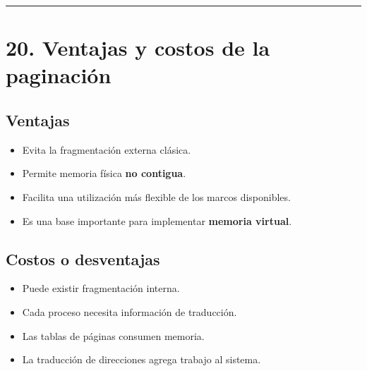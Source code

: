 \documentclass[
  spanish,
  letterpaper,
]{scrbook}
\providecommand{\tightlist}{%
  \setlength{\itemsep}{0pt}\setlength{\parskip}{0pt}}
\begin{document}
\begin{center}\rule{0.5\linewidth}{0.5pt}\end{center}


\chapter{20. Ventajas y costos de la
paginación}\label{ventajas-y-costos-de-la-paginaciuxf3n}

\section{Ventajas}\label{ventajas-10}

\begin{itemize}
\tightlist
\item
  Evita la fragmentación externa clásica.
\item
  Permite memoria física \textbf{no contigua}.
\item
  Facilita una utilización más flexible de los marcos disponibles.
\item
  Es una base importante para implementar \textbf{memoria virtual}.
\end{itemize}

\section{Costos o desventajas}\label{costos-o-desventajas}

\begin{itemize}
\tightlist
\item
  Puede existir fragmentación interna.
\item
  Cada proceso necesita información de traducción.
\item
  Las tablas de páginas consumen memoria.
\item
  La traducción de direcciones agrega trabajo al sistema.
\end{itemize}
\end{document}
